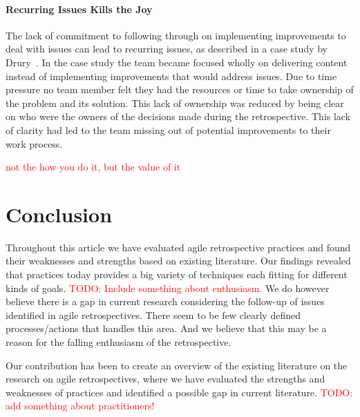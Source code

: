 \documentclass[12pt]{article}
\newcommand\todo[1]{\textcolor{red}{#1}}
\begin{document}
\paragraph{Recurring Issues Kills the Joy}
The lack of commitment to following through on implementing improvements to deal with issues can lead to recurring issues, as described in a case study by Drury~\cite{Drury2012}. In the case study the team became focused wholly on delivering content instead of implementing improvements that would address issues. Due to time pressure no team member felt they had the resources or time to take ownership of the problem and its solution. This lack of ownership was reduced by being clear on who were the owners of the decisions made during the retrospective. This lack of clarity had led to the team missing out of potential improvements to their work process. 

\todo{not the how you do it, but the value of it}

\section{Conclusion}
Throughout this article we have evaluated agile retrospective practices and found their weaknesses and strengths based on existing literature. Our findings revealed that practices today provides a big variety of techniques each fitting for different kinds of goals. \todo{TODO: Include something about enthusiasm.} We do however believe there is a gap in current research considering the follow-up of issues identified in agile retrospectives. There seem to be few clearly defined processes/actions that handles this area. And we believe that this may be a reason for the falling enthusiasm of the retrospective. 

Our contribution has been to create an overview of the existing literature on the research on agile retrospectives, where we have evaluated the strengths and weaknesses of practices and identified a possible gap in current literature. \todo{TODO: add something about practitioners!}

\clearpage



\end{document}
